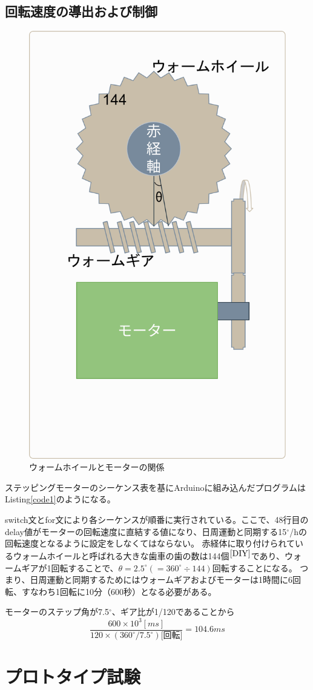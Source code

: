\documentclass[../../main]{subfiles}
\begin{document}
\subsection{回転速度の導出および制御}
\begin{figure}
  \centering
  \includegraphics[width=.3\textwidth]{gear.png}
  \caption{ウォームホイールとモーターの関係}
\end{figure}
ステッピングモーターのシーケンス表を基にArduinoに組み込んだプログラムはListing\ref{code1}のようになる。

switch文とfor文により各シーケンスが順番に実行されている。ここで、48行目のdelay値がモーターの回転速度に直結する値になり、日周運動と同期する15$^\circ$/hの回転速度となるように設定をしなくてはならない。
赤経体に取り付けられているウォームホイールと呼ばれる大きな歯車の歯の数は144個$^{\cite{DIY}}$であり、ウォームギアが1回転することで、$\theta = 2.5^\circ (= 360^\circ \div 144)$回転することになる。
つまり、日周運動と同期するためにはウォームギアおよびモーターは1時間に6回転、すなわち1回転に10分（600秒）となる必要がある。

モーターのステップ角が7.5$^\circ$、ギア比が1/120であることから
\[ \frac{600 \times 10^3 \si{[ms]}}{120 \times (360^\circ / 7.5^\circ) \text{[回転]}} = 104.6 \si{ms} \]

\begin{tcolorbox}[title=, breakable]

\end{tcolorbox}
\section{プロトタイプ試験}
\end{document}

